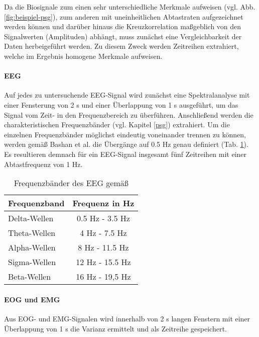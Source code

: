 Da die Biosignale zum einen sehr unterschiedliche Merkmale aufweisen (vgl. Abb. \ref{fig:beispiel-psg}), zum anderen mit uneinheitlichen Abtastraten aufgezeichnet werden können und darüber hinaus die Kreuzkorrelation maßgeblich von den Signalwerten (Amplituden) abhängt, muss zunächst eine Vergleichbarkeit der Daten herbeigeführt werden. Zu diesem Zweck werden Zeitreihen extrahiert, welche im Ergebnis homogene Merkmale aufweisen.

\paragraph{\acs{EEG}}
Auf jedes zu untersuchende \acs{EEG}-Signal wird zunächst eine Spektralanalyse mit einer Fensterung von 2 s und einer Überlappung von 1 s ausgeführt, um das Signal vom Zeit- in den Frequenzbereich zu überführen. Anschließend werden die charakteristischen Frequenzbänder (vgl. Kapitel \ref{psg}) extrahiert. Um die einzelnen Frequenzbänder möglichst eindeutig voneinander trennen zu können, werden gemäß Bashan et al. die Übergänge auf 0.5 Hz genau definiert (Tab. \ref{tab:frequenzen}). Es resultieren demnach für ein \acs{EEG}-Signal insgesamt fünf Zeitreihen mit einer Abtastfrequenz von 1 Hz. \parencite{bashan_network_2012}\\


\begin{table}[H] 
\centering
\begin{small}
\begin{tabular}{lc}
\toprule
\multicolumn{1}{l}{\textbf{Frequenzband}} & \multicolumn{1}{c}{\textbf{Frequenz in Hz}}\\  
\midrule
Delta-Wellen & 0.5 Hz - 3.5 Hz\\
Theta-Wellen & 4 Hz - 7.5 Hz\\
Alpha-Wellen & 8 Hz - 11.5 Hz\\
Sigma-Wellen & 12 Hz - 15.5 Hz\\
Beta-Wellen & 16 Hz - 19,5 Hz\\
\bottomrule
\end{tabular}
\caption[Frequenzbänder des \acs{EEG}]{Frequenzbänder des \acs{EEG} gemäß \parencite{bashan_network_2012}}
\label{tab:frequenzen}
\end{small}
\end{table}

\paragraph{\acs{EOG} und \acs{EMG}}
Aus \acs{EOG}- und \acs{EMG}-Signalen wird innerhalb von 2 s langen Fenstern mit einer Überlappung von 1 s die Varianz ermittelt und als Zeitreihe gespeichert.\parencite{bashan_network_2012}

